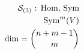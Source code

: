 \documentclass[preview]{standalone}
\begin{document}
\begin{align*}
\special{dvisvgm:raw <g id='unique000'>}\mathcal{S}_{(3)}\text{ : Hom, Sym}\\\operatorname{Sym}^m(V)\\\dim = \binom{n+m-1}{m}\special{dvisvgm:raw </g>}
\end{align*}
\end{document}
